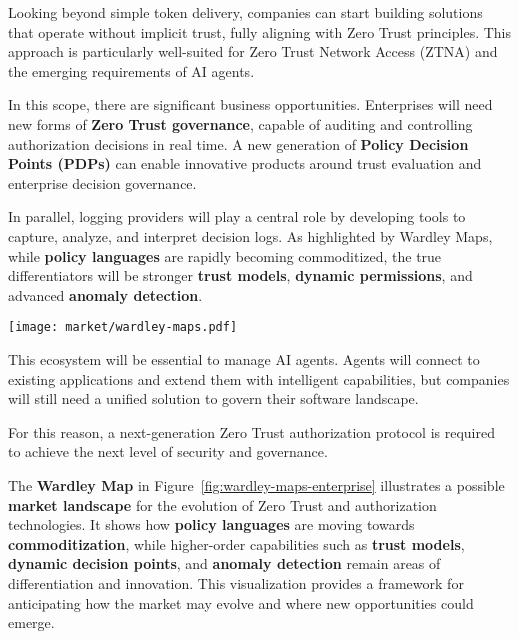 Looking beyond simple token delivery, companies can start building solutions that operate without implicit trust, fully aligning with Zero Trust principles. 
This approach is particularly well-suited for Zero Trust Network Access (ZTNA) and the emerging requirements of AI agents.  

\vspace{0.5em} In this scope, there are significant business opportunities.  
Enterprises will need new forms of \textbf{Zero Trust governance}, capable of auditing and controlling authorization decisions in real time.  
A new generation of \textbf{Policy Decision Points (PDPs)} can enable innovative products around trust evaluation and enterprise decision governance.  

\vspace{0.5em} In parallel, logging providers will play a central role by developing tools to capture, analyze, and interpret decision logs.  
As highlighted by Wardley Maps, while \textbf{policy languages} are rapidly becoming commoditized, the true differentiators will be stronger \textbf{trust models}, \textbf{dynamic permissions}, and advanced \textbf{anomaly detection}.  

\begin{figure*}[htbp]
    \centering
    \texttt{[image: market/wardley-maps.pdf]}
    \caption{Wardley Maps for Zero Trust AuthZ}
    \label{fig:wardley-maps-enterprise}
\end{figure*}

\vspace{0.5em}  This ecosystem will be essential to manage AI agents. Agents will connect to existing applications and extend them with intelligent capabilities, but companies will still need a unified solution to govern their software landscape.  

\vspace{0.5em} For this reason, a next-generation Zero Trust authorization protocol is required to achieve the next level of security and governance.

\begin{boxF}
    The \textbf{Wardley Map} in Figure~\ref{fig:wardley-maps-enterprise} illustrates a possible 
    \textbf{market landscape} for the evolution of Zero Trust and authorization technologies.  
    It shows how \textbf{policy languages} are moving towards \textbf{commoditization}, 
    while higher-order capabilities such as \textbf{trust models}, \textbf{dynamic decision points}, 
    and \textbf{anomaly detection} remain areas of differentiation and innovation.  
    This visualization provides a framework for anticipating how the market may evolve 
    and where new opportunities could emerge.
\end{boxF}


